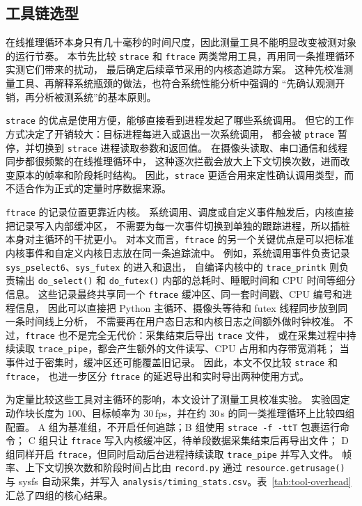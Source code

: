\subsection{工具链选型}\label{sec:tool-selection}

在线推理循环本身只有几十毫秒的时间尺度，因此测量工具不能明显改变被测对象的运行节奏。
本节先比较 \texttt{strace} 和 \texttt{ftrace} 两类常用工具，再用同一条推理循环实测它们带来的扰动，
最后确定后续章节采用的内核态追踪方案。
这种先校准测量工具、再解释系统瓶颈的做法，也符合系统性能分析中强调的
``先确认观测开销，再分析被测系统''的基本原则\cite{perfbook}。

\texttt{strace}\cite{strace} 的优点是使用方便，能够直接看到进程发起了哪些系统调用。
但它的工作方式决定了开销较大：目标进程每进入或退出一次系统调用，
都会被 \texttt{ptrace} 暂停，并切换到 \texttt{strace} 进程读取参数和返回值。
在摄像头读取、串口通信和线程同步都很频繁的在线推理循环中，
这种逐次拦截会放大上下文切换次数，进而改变原本的帧率和阶段耗时结构。
因此，\texttt{strace} 更适合用来定性确认调用类型，而不适合作为正式的定量时序数据来源。

\texttt{ftrace}\cite{ftrace} 的记录位置更靠近内核。
系统调用、调度或自定义事件触发后，内核直接把记录写入内部缓冲区，
不需要为每一次事件切换到单独的跟踪进程，所以插桩本身对主循环的干扰更小。
对本文而言，\texttt{ftrace} 的另一个关键优点是可以把标准内核事件和自定义内核日志放在同一条追踪流中。
例如，系统调用事件负责记录 \texttt{sys\_pselect6}、\texttt{sys\_futex} 的进入和退出，
自编译内核中的 \texttt{trace\_printk} 则负责输出 \texttt{do\_select()} 和
\texttt{do\_futex()} 内部的总耗时、睡眠时间和 CPU 时间等细分信息。
这些记录最终共享同一个 \texttt{ftrace} 缓冲区、同一套时间戳、CPU 编号和进程信息，
因此可以直接把 Python 主循环、摄像头等待和 futex 线程同步放到同一条时间线上分析，
不需要再在用户态日志和内核日志之间额外做时钟校准。
不过，\texttt{ftrace} 也不是完全无代价：采集结束后导出 \texttt{trace} 文件，
或在采集过程中持续读取 \texttt{trace\_pipe}，都会产生额外的文件读写、CPU 占用和内存带宽消耗；
当事件过于密集时，缓冲区还可能覆盖旧记录。
因此，本文不仅比较 \texttt{strace} 和 \texttt{ftrace}，
也进一步区分 \texttt{ftrace} 的延迟导出和实时导出两种使用方式。

为定量比较这些工具对主循环的影响，本文设计了测量工具校准实验。
实验固定动作块长度为 100、目标帧率为 30\,fps，并在约 30\,s 的同一类推理循环上比较四组配置。
A 组为基准组，不开启任何追踪；B 组使用 \texttt{strace -f -ttT} 包裹运行命令；
C 组只让 \texttt{ftrace} 写入内核缓冲区，待单段数据采集结束后再导出文件；
D 组同样开启 \texttt{ftrace}，但同时启动后台进程持续读取 \texttt{trace\_pipe} 并写入文件。
帧率、上下文切换次数和阶段时间占比由 \texttt{record.py} 通过
\texttt{resource.getrusage()} 与 sysfs 自动采集，并写入
\texttt{analysis/timing\_stats.csv}。表~\ref{tab:tool-overhead} 汇总了四组的核心结果。

